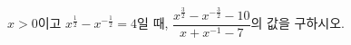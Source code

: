 $x>0$이고 $x^{\frac{1}{2}}-x^{-\frac{1}{2}}=4$일 때, $\dfrac{x^{\frac{3}{2}}-x^{-\frac{3}{2}}-10}{x+x^{-1}-7}$의 값을 구하시오.
